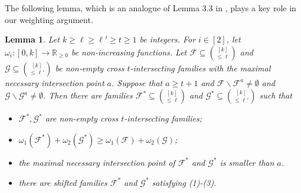 \documentclass[11pt]{article}
\newtheorem{lemma}[theorem]{Lemma}
\begin{document}
The following lemma, which is an analogue of Lemma 3.3 in \cite{G23}, plays a key role in our weighting argument.







\begin{lemma}\label{35}
     Let $k \geq \ell \geq \ell' \geq t\geq 1$  be integers. For $i \in[2]$, let $\omega_i:[0,k] \rightarrow \mathbb{R}_{\geq 0}$ be non-increasing functions.  Let $\mathcal{F}\subseteq\binom{[k]}{\leq \ell}$ and $\mathcal{G} \subseteq\binom{[k]}{\leq \ell'}$ be non-empty cross $t$-intersecting families with the maximal necessary intersection point $a$. Suppose that $a \geq t+1$ and $\mathcal{F} \backslash \mathcal{F}^a \neq \emptyset$ and $\mathcal{G} \backslash \mathcal{G}^a \neq \emptyset$. Then there are families $\mathcal{F}^*\subseteq\binom{[k]}{\leq \ell}$ and $\mathcal{G}^* \subseteq\binom{[k]}{\leq \ell'}$  such that
     \begin{itemize}
         \item [(1)] $\mathcal{F}^*, \mathcal{G}^*$ are non-empty cross $t$-intersecting families;
        \item[(2)]  $\omega_1(\mathcal{F}^*)+\omega_2(\mathcal{G}^*)\ge \omega_1(\mathcal{F})+\omega_2(\mathcal{G})$;
        \item[(3)] the maximal necessary intersection point of $\mathcal{F}^*$ and $\mathcal{G}^*$ is smaller than $a$.
         \item[(4)] there are shifted families $\mathcal{F}^*$ and $\mathcal{G}^*$ satisfying (1)-(3).
     \end{itemize}
\end{lemma}
\end{document}

